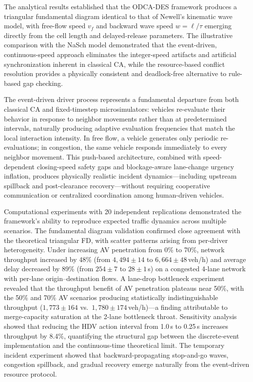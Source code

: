 \documentclass[review,authoryear]{elsarticle}
\begin{document}
The analytical results established that the ODCA-DES framework produces a triangular fundamental diagram identical to that of Newell's kinematic wave model, with free-flow speed $v_f$ and backward wave speed $w = \ell/\tau$ emerging directly from the cell length and delayed-release parameters. The illustrative comparison with the NaSch model demonstrated that the event-driven, continuous-speed approach eliminates the integer-speed artifacts and artificial synchronization inherent in classical CA, while the resource-based conflict resolution provides a physically consistent and deadlock-free alternative to rule-based gap checking.

The event-driven driver process represents a fundamental departure from both classical CA and fixed-timestep microsimulators: vehicles re-evaluate their behavior in response to neighbor movements rather than at predetermined intervals, naturally producing adaptive evaluation frequencies that match the local interaction intensity. In free flow, a vehicle generates only periodic re-evaluations; in congestion, the same vehicle responds immediately to every neighbor movement. This push-based architecture, combined with speed-dependent closing-speed safety gaps and blockage-aware lane-change urgency inflation, produces physically realistic incident dynamics---including upstream spillback and post-clearance recovery---without requiring cooperative communication or centralized coordination among human-driven vehicles.

Computational experiments with 20 independent replications demonstrated the framework's ability to reproduce expected traffic dynamics across multiple scenarios. The fundamental diagram validation confirmed close agreement with the theoretical triangular FD, with scatter patterns arising from per-driver heterogeneity. Under increasing AV penetration from 0\% to 70\%, network throughput increased by 48\% (from $4{,}494 \pm 14$ to $6{,}664 \pm 48$\,veh/h) and average delay decreased by 89\% (from $254 \pm 7$ to $28 \pm 1$\,s) on a congested 4-lane network with per-lane origin--destination flows. A lane-drop bottleneck experiment revealed that the throughput benefit of AV penetration plateaus near 50\%, with the 50\% and 70\% AV scenarios producing statistically indistinguishable throughput ($1{,}773 \pm 164$ vs.\ $1{,}780 \pm 174$\,veh/h)---a finding attributable to merge-capacity saturation at the 2-lane bottleneck throat. Sensitivity analysis showed that reducing the HDV action interval from 1.0\,s to 0.25\,s increases throughput by 8.4\%, quantifying the structural gap between the discrete-event implementation and the continuous-time theoretical limit. The temporary incident experiment showed that backward-propagating stop-and-go waves, congestion spillback, and gradual recovery emerge naturally from the event-driven resource protocol.
\end{document}
